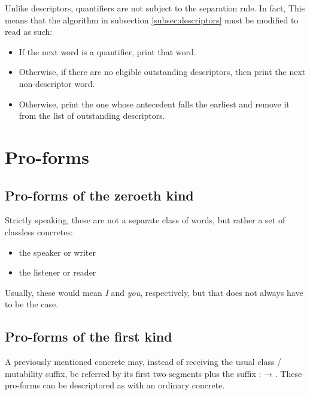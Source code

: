 \documentclass{book}
\begin{document}
Unlike descriptors, quantifiers are not subject to the separation rule. In fact, \emph{} This means that the algorithm in subsection \ref{subsec:descriptors} must be modified to read as such:

\begin{itemize}
  \item If the next word is a quantifier, print that word.
  \item Otherwise, if there are no eligible outstanding descriptors, then print the next non-descriptor word.
  \item Otherwise, print the one whose antecedent falls the earliest and remove it from the list of outstanding descriptors.
\end{itemize}

\section{Pro-forms}


\subsection{Pro-forms of the zeroeth kind}

Strictly speaking, these are not a separate class of words, but rather a set of classless concretes:

\begin{itemize}
  \item {} the speaker or writer
  \item {} the listener or reader
\end{itemize}

Usually, these would mean \emph{I} and \emph{you}, respectively, but that does not always have to be the case.

\subsection{Pro-forms of the first kind}

A previously mentioned concrete may, instead of receiving the usual class / mutability suffix, be referred by its first two segments plus the suffix :  → . These pro-forms can be descriptored as with an ordinary concrete.
\end{document}
